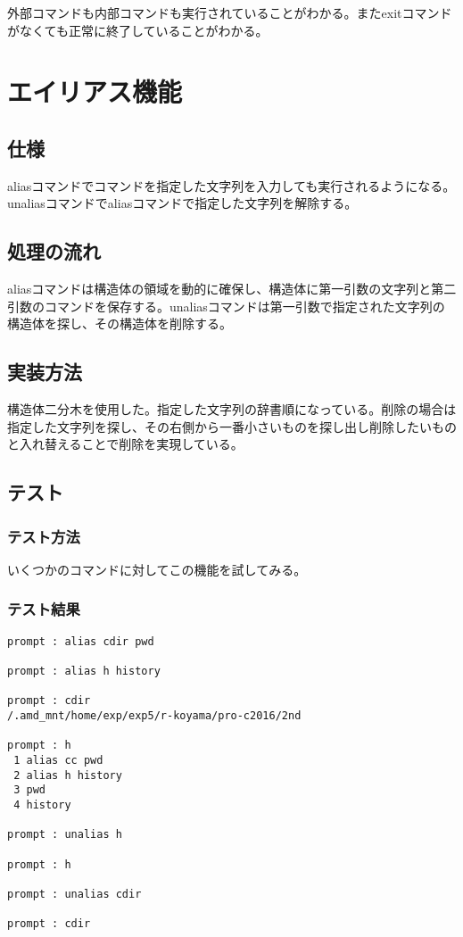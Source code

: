 \documentclass{procreport}
\begin{document}
外部コマンドも内部コマンドも実行されていることがわかる。またexitコマンドがなくても正常に終了していることがわかる。

\section{エイリアス機能}

\subsection{仕様}
aliasコマンドでコマンドを指定した文字列を入力しても実行されるようになる。unaliasコマンドでaliasコマンドで指定した文字列を解除する。
\subsection{処理の流れ}
aliasコマンドは構造体の領域を動的に確保し、構造体に第一引数の文字列と第二引数のコマンドを保存する。unaliasコマンドは第一引数で指定された文字列の構造体を探し、その構造体を削除する。
\subsection{実装方法}
構造体二分木を使用した。指定した文字列の辞書順になっている。削除の場合は指定した文字列を探し、その右側から一番小さいものを探し出し削除したいものと入れ替えることで削除を実現している。
\subsection{テスト}
\subsubsection{テスト方法}
いくつかのコマンドに対してこの機能を試してみる。
\subsubsection{テスト結果}
\begin{screen}
\begin{verbatim}
prompt : alias cdir pwd

prompt : alias h history

prompt : cdir
/.amd_mnt/home/exp/exp5/r-koyama/pro-c2016/2nd

prompt : h
 1 alias cc pwd
 2 alias h history
 3 pwd
 4 history

prompt : unalias h

prompt : h

prompt : unalias cdir

prompt : cdir
\end{verbatim}
\end{screen}
\end{document}
